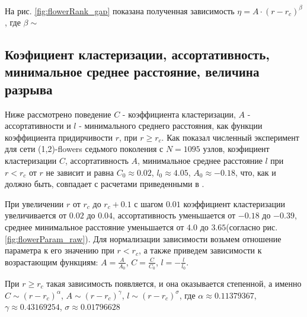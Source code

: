 \documentclass[10pt,aps,pra]{revtex4-1}
\begin{document}
На рис. \ref{fig:flowerRank_gap} показана полученная зависимость $\eta = A \cdot {(r-r_c)}^\beta$, где $\beta \sim $

\subsection{Коэфициент кластеризации, ассортативность, минимальное среднее расстояние, величина разрыва}
Ниже рассмотрено поведение $C$ - коэффициента кластеризации, $A$ - ассортативности и $l$ - минимального среднего расстояния, как функции коэффициента придирчивости $r$, при $r \geq r_c$. Как показал численный эксперимент для сети (1,2)-flowers седьмого поколения с $N=1095$ узлов, коэфициент кластеризации $C$, ассортативность $A$, минимальное среднее расстояние $l$ при $r<r_c$ от $r$ не зависит и равна $C_0 \approx 0.02$, $l_0 \approx 4.05$, $A_0 \approx -0.18$, что, как и должно быть, совпадает с расчетами приведенными в \cite{Rozenfeld1,Rozenfeld2}. 

При увеличении $r$ от $r_c$ до $r_c + 0.1$ с шагом $0.01$ коэффициент кластеризации увеличивается от $0.02$ до $0.04$, ассортативность уменьшается от $-0.18$ до $-0.39$, среднее минимальное расстояние уменьшается от $4.0$ до $3.65$(согласно рис. \ref{fig:flowerParam_raw}). Для нормализации зависимости возьмем отношение параметра к его значению при $r<r_c$, а также приведем зависимости к возрастающим функциям: $A=\frac{A}{A_0}$, $C=\frac{C}{C_0}$, $l=-\frac{l}{l_0}$.

При $r \geq r_c$ такая зависимость появляется, и она оказывается степенной, а именно $C \sim {(r-r_c)}^\alpha$, $A \sim {(r-r_c)}^\gamma$, $l \sim {(r-r_c)}^\sigma$, где $\alpha \approx 0.11379367$, $\gamma \approx 0.43169254$, $\sigma \approx 0.01796628$
\end{document}
